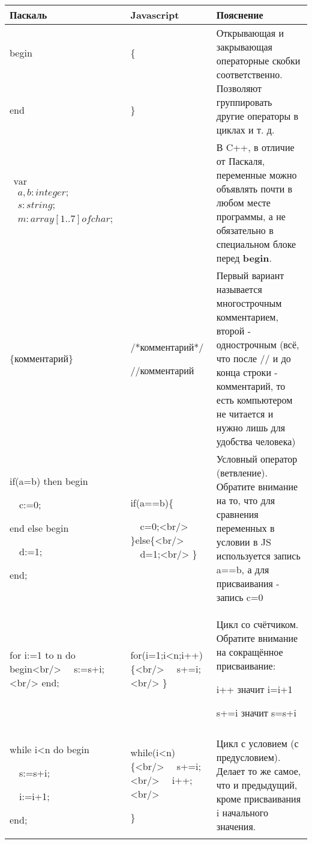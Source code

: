 \begin{table}[ph]

\begin{tabular}{|l|l|l|}
\hline
			Паскаль
&			Javascript
&			Пояснение
\\\hline
			begin
&
			\{
&
	\multirow{2}{*}{
			Открывающая и закрывающая операторные скобки соответственно.
			Позволяют группировать другие операторы в циклах и т. д.
	}
\\\hline
			end
&			\}
&
\\\hline
			$\begin{array}{l}
			\mbox{var}
			\\
			~~a,b: integer;
			\\
			~~s: string;
			\\
			~~m: array[1..7] of char;
			\end{array}$
&
			\barecodesnippet{code-snippets/analog-var.cpp}{language=C++}
&
			В C++, в отличие от Паскаля, переменные можно объявлять почти в любом месте программы,
			а не обязательно в специальном блоке перед \textbf{begin}.
\\\hline
			\{комментарий\}
&
			/*комментарий*/

			//комментарий
&
			Первый вариант называется многострочным комментарием, второй - однострочным
			(всё, что после // и до конца строки - комментарий,
			то есть компьютером не читается и нужно лишь для удобства человека)
\\\hline
			if(a=b) then begin

			~~c:=0;

			end else begin

			~~d:=1;

			end;
&			if(a==b)\{

			~~c=0;<br/>
			\}else\{<br/>
			~~d=1;<br/>
			\}
&			Условный оператор (ветвление).
			Обратите внимание на то, что для сравнения переменных в условии в JS используется запись
			a==b, а для присваивания - запись c=0
\\\hline
			for i:=1 to n do begin<br/>
			~~s:=s+i;<br/>
			end;
&			for(i=1;i<n;i++)\{<br/>
			~~s+=i;<br/>
			\}
&			Цикл со счётчиком.
			Обратите внимание на сокращённое присваивание:

				i++ значит i=i+1

			s+=i значит s=s+i
\\\hline
			while i<n do begin

			~~s:=s+i;

			~~i:=i+1;

			end;
&			while(i<n)\{<br/>
			~~s+=i;<br/>
			~~i++;<br/>

			\}
&			Цикл с условием (с предусловием).
			Делает то же самое, что и предыдущий, кроме присваивания i начального значения.

\\\hline
\end{tabular}

\end{table}
